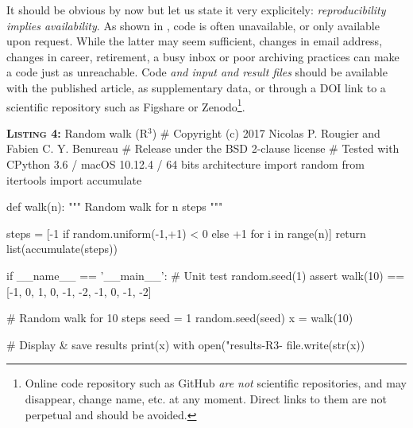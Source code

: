 \documentclass[a4paper,11pt]{article}
\begin{document}
It should be obvious by now but let us state it very explicitely:
\emph{reproducibility implies availability}. As shown in \citep{Collberg:2016},
code is often unavailable, or only available upon request. While the latter may
seem sufficient, changes in email address, changes in career, retirement, a
busy inbox or poor archiving practices can make a code just as
unreachable. Code \emph{and input and result files} should be available with
the published article, as supplementary data, or through a DOI link to a
scientific repository such as Figshare or Zenodo\footnote{Online code
  repository such as GitHub \emph{are not} scientific repositories, and may
  disappear, change name, etc. at any moment. Direct links to them are not
  perpetual and should be avoided.}.

 
\begin{code}{\textbf{\textsc{Listing 4:}} Random walk (R$^3$)}
# Copyright (c) 2017 Nicolas P. Rougier and Fabien C. Y. Benureau
# Release under the BSD 2-clause license
# Tested with CPython 3.6 / macOS 10.12.4 / 64 bits architecture
import random
from itertools import accumulate

def walk(n):
    """ Random walk for n steps """
  
    steps = [-1 if random.uniform(-1,+1) < 0 else +1 for i in range(n)]
    return list(accumulate(steps))

if __name__ == '__main__':
    # Unit test
    random.seed(1)
    assert walk(10) == [-1, 0, 1, 0, -1, -2, -1, 0, -1, -2]

    # Random walk for 10 steps
    seed = 1
    random.seed(seed)
    x = walk(10)
    
    # Display & save results
    print(x)
    with open("results-R3-%
        file.write(str(x))
\end{code}
\end{document}
